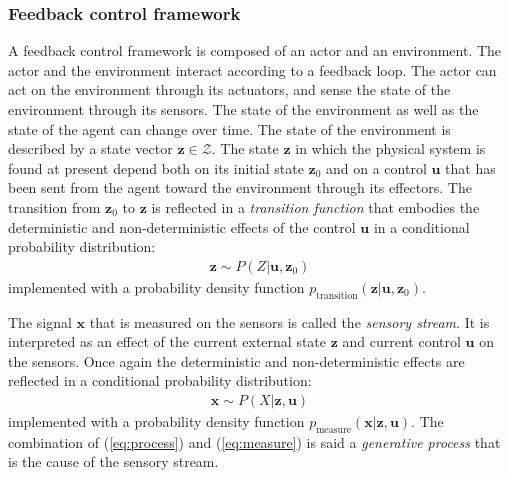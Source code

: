 \documentclass{article}
\begin{document}
\subsubsection{Feedback control framework}
A feedback control framework is composed of an actor and an environment. The actor and the environment interact according to a feedback loop. 
The actor can act on the environment through its actuators, and sense the state of the environment through its sensors. 
The state of the environment as well as the state of the agent can change over time. The state of the environment is described by a state vector $\boldsymbol{z} \in \mathcal{Z}$.
The state $\boldsymbol{z}$ in which the physical system is found at present depend both on its initial state $\boldsymbol{z}_0$ and on a control $\boldsymbol{u}$ that has been sent from the agent toward the environment through its effectors.  The transition from $\boldsymbol{z}_0$ to $\boldsymbol{z}$ is reflected in a \emph{transition function} that embodies the deterministic and non-deterministic effects of the control $\boldsymbol{u}$ in a conditional probability distribution:  
\begin{align}
\boldsymbol{z} \sim P(Z|\boldsymbol{u},\boldsymbol{z}_0) \label{eq:process}
\end{align}
implemented with a probability density function $p_\text{transition}(\boldsymbol{z}|\boldsymbol{u},\boldsymbol{z}_0)$.

The signal $\boldsymbol{x}$ that is measured on the sensors is called the \emph{sensory stream}. It is interpreted as an effect of the current external state $\boldsymbol{z}$ and current control $\boldsymbol{u}$ on the sensors. Once again the deterministic and non-deterministic effects are reflected in a conditional probability distribution:
\begin{align}
\boldsymbol{x} \sim P(X|\boldsymbol{z},\boldsymbol{u})\label{eq:measure}
\end{align}
implemented with a probability density function $p_\text{measure}(\boldsymbol{x}|\boldsymbol{z},\boldsymbol{u})$.
The combination of  (\ref{eq:process}) and (\ref{eq:measure}) is said a \emph{generative process} that is the cause of the sensory stream. 

\end{document}
